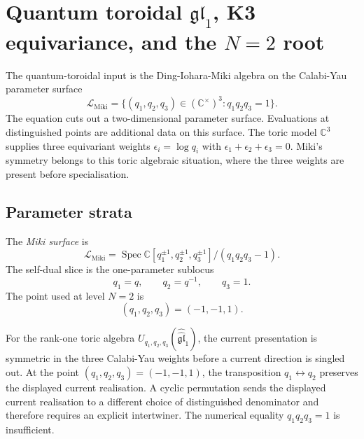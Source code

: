 \section{Quantum toroidal \texorpdfstring{$\mathfrak{gl}_1$}{gl1},
K3 equivariance, and the \texorpdfstring{$N=2$}{N=2} root}
\label{sec:qtgl1-k3-n2-root}

\providecommand{\DIM}{\mathrm{DIM}}
\providecommand{\gghone}{\widehat{\widehat{\mathfrak{gl}}}_1}
\providecommand{\Uqtgltor}{U_{q_1,q_2,q_3}(\gghone)}
\providecommand{\CoHA}{\mathrm{CoHA}}
\providecommand{\Irr}{\mathrm{Irr}}

The quantum-toroidal input is the Ding-Iohara-Miki algebra on the
Calabi-Yau parameter surface
\[
  \mathcal L_{\mathrm{Miki}}
  =
  \{(q_1,q_2,q_3)\in(\mathbb C^\times)^3:
  q_1q_2q_3=1\}.
\]
The equation cuts out a two-dimensional parameter surface.  Evaluations
at distinguished points are additional data on this surface.  The toric model
$\mathbb C^3$ supplies three equivariant weights
$\epsilon_i=\log q_i$ with
$\epsilon_1+\epsilon_2+\epsilon_3=0$.  Miki's symmetry belongs to this
toric algebraic situation, where the three weights are present before
specialisation.

\subsection{Parameter strata}
\label{subsec:qtet-parameter-strata}

\begin{definition}
The \emph{Miki surface} is
\[
 \mathcal L_{\mathrm{Miki}}
 = \operatorname{Spec}
 \mathbb C[q_1^{\pm1},q_2^{\pm1},q_3^{\pm1}]
 /(q_1q_2q_3-1).
\]
The self-dual slice is the one-parameter sublocus
\[
  q_1=q,\qquad q_2=q^{-1},\qquad q_3=1.
\]
The point used at level \(N=2\) is
\[
  (q_1,q_2,q_3)=(-1,-1,1).
\]
\end{definition}

\begin{proposition}
\label{prop:qtet-miki-specialisation}
For the rank-one toric algebra \(\Uqtgltor\), the current
presentation is symmetric in the three Calabi-Yau weights before a
current direction is singled out.  At the point
\((q_1,q_2,q_3)=(-1,-1,1)\), the transposition \(q_1\leftrightarrow
q_2\) preserves the displayed current realisation.  A cyclic
permutation sends the displayed current realisation to a different
choice of distinguished denominator and therefore requires an explicit
intertwiner.  The numerical equality \(q_1q_2q_3=1\) is insufficient.
\end{proposition}

